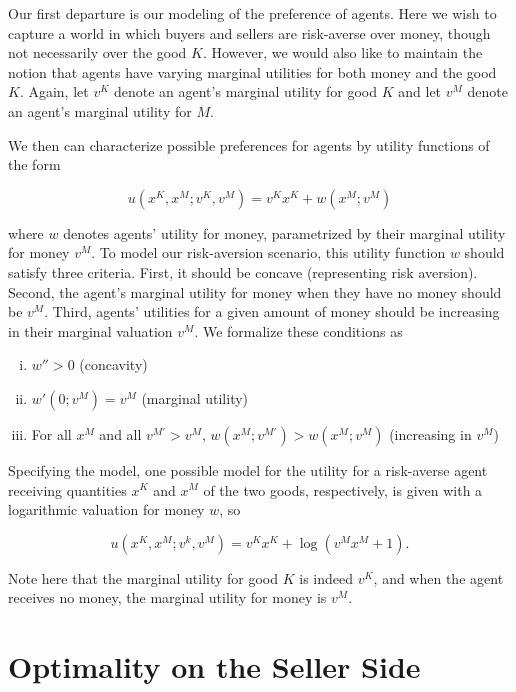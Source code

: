 \documentclass[AER]{AEA}
\begin{document}
Our first departure is our modeling of the preference of agents. Here we wish to capture a world in which buyers and sellers are risk-averse over money, though not necessarily over the good $K$. However, we would also like to maintain the notion that agents have varying marginal utilities for both money and the good $K$. Again, let $v^K$ denote an agent's marginal utility for good $K$ and let $v^M$ denote an agent's marginal utility for $M$. 

We then can characterize possible preferences for agents by utility functions of the form

$$
u(x^K, x^M; v^K, v^M) = v^K x^K + w(x^M; v^M)
$$

where $w$ denotes agents' utility for money, parametrized by their marginal utility for money $v^M$. To model our risk-aversion scenario, this utility function $w$ should satisfy three criteria. First, it should be concave (representing risk aversion). Second, the agent's marginal utility for money when they have no money should be $v^M$. Third, agents' utilities for a given amount of money should be increasing in their marginal valuation $v^M$. We formalize these conditions as

\begin{enumerate}[(i)]
    \item $w'' > 0$ (concavity)
    \item $w'(0; v^M) = v^M$ (marginal utility)
    \item For all $x^M$ and all $v^{M'} > v^M$, $w(x^M; v^{M'}) > w(x^M; v^M)$ (increasing in $v^M$)
\end{enumerate}

Specifying the model, one possible model for the utility for a risk-averse agent receiving quantities $x^K$ and $x^M$ of the two goods, respectively, is given with a logarithmic valuation for money $w$, so

$$
u(x^K, x^M; v^k, v^M) = v^K x^K + \log(v^M x^M + 1).
$$

Note here that the marginal utility for good $K$ is indeed $v^K$, and when the agent receives no money, the marginal utility for money is $v^M$.


\section{Optimality on the Seller Side}
\end{document}
